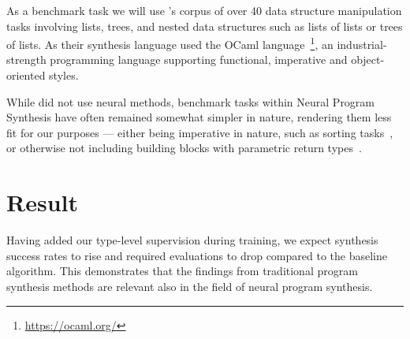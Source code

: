 \documentclass{article}
\begin{document}

As a benchmark task we will use \cite{feser2015synthesizing}'s corpus of over 40 data structure manipulation tasks involving lists, trees, and nested data structures such as lists of lists or trees of lists.
As their synthesis language \cite{feser2015synthesizing} used the OCaml language~\footnote{\url{https://ocaml.org/}}, an industrial-strength programming language supporting functional, imperative and object-oriented styles.

While \cite{feser2015synthesizing} did not use neural methods, benchmark tasks within Neural Program Synthesis have often remained somewhat simpler in nature, rendering them less fit for our purposes --- either being imperative in nature, such as sorting tasks~\citep{reed2015neural}, or otherwise not including building blocks with parametric return types~\citep{nsps}.



\section{Result}

Having added our type-level supervision during training, we expect synthesis success rates to rise and required evaluations to drop compared to the baseline algorithm. This demonstrates that the findings from traditional program synthesis methods are relevant also in the field of neural program synthesis.




\end{document}
